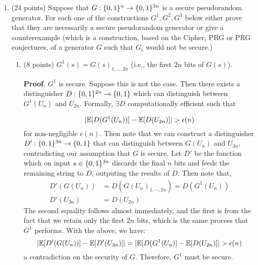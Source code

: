 \documentclass{article}
\begin{document}
\begin{enumerate}[,start=2]
\item{}
(24 points) Suppose that $G:\{0,1\}^n\rightarrow\{0,1\}^{3n}$ is a secure pseudorandom generator. For each one of the constructions $G^1,G^2,G^3$ below either prove that they are necessarily a secure pseudorandom generator or give a counterexample (which is a construction, based on the Cipher, PRG or PRG conjectures, of a generator $G$ such that $G_i$ would not be secure.)%

\begin{enumerate}[noitemsep,topsep=\mdcompacttopsep,label=\alph*.]%

\item{}(8 points) $G^1(s)=G(s)_{1,\ldots,2n}$ (i.e., the first $2n$ bits of $G(s)$).

\begin{mdbmarginx}{1ex}{0pt}{1ex}{0pt}%
\noindent{}\textbf{Proof}.  $G^1$ is secure. Suppose this is not the case. Then there exists a distinguisher 
$D: \{0,1\}^{2n} \to \{0,1\}$ which can distinguish
between $G^1(U_n)$ and $U_{2n}$. Formally, $\exists D$ computationally efficient such that%
\end{mdbmarginx}%
\noindent\noindent\[%
|\E[D(G^1(U_n))] - \E[D(U_{2n})]| > \epsilon(n)
\]%
for non-negligible $\epsilon(n)$.
Then note that we can construct a distinguisher $D': \{0,1\}^{3n} \to \{0,1\}$
that can distinguish between $G(U_n)$ and $U_{3n}$, contradicting our assumption that $G$ is secure.
Let $D'$ be the function which on input $s \in \{0,1\}^{3n}$ discards the final $n$ bits and feeds
the remaining string to $D$, outputing the results of $D$. Then note that,
\noindent\noindent\[%
\begin{aligned}
D'(G(U_n)) &= D(G(U_n)_{1,\cdots,2n}) = D(G^1(U_n)) \\
D'(U_{3n}) &= D(U_{2n})   
\end{aligned}
\]%
The second equality follows almost immediately, and the first is from the fact that we retain only
the first $2n$ bits, which is the same process that $G^1$ performs. With the above, we have:
\noindent\noindent\[%
|\E[D'(G(U_n))] - \E[D'(U_{3n})]| = | \E[D(G^1(U_n)] - \E[D(U_{2n})] | > \epsilon(n) 
\]%
a contradiction on the security of $G$. Therefore, $G^1$ must be secure.
\mdfloatright{\ensuremath{\Box}}%


\end{enumerate}
\end{enumerate}
\end{document}
